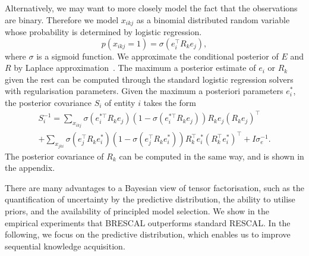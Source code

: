 Alternatively, we may want to more closely model the fact that the observations are binary.
Therefore we model $x_{ikj}$ as a binomial distributed random variable whose
probability is determined by logistic regression.
\[
p(x_{ikj}=1) = \sigma(e_i^{\top} R_k e_j),
\]
where $\sigma$ is a sigmoid function.
We approximate the conditional posterior of
$E$ and $R$ by Laplace approximation~\cite{bishop2006pattern}. The maximum a
posterior estimate of $e_i$ or $R_k$ given the rest can be computed through the
standard logistic regression solvers with regularisation parameters. Given the
maximum a posteriori parameters $e_i^*$, the posterior covariance $S_i$ of entity
$i$ takes the form
\begin{align*}
S_i^{-1} = \sum_{x_{ikj}} \sigma(e_{i}^{*\top} R_k e_{j}) (1 - \sigma(e_{i}^{*\top} R_k e_{j})) R_k
e_{j}(R_k e_{j})^\top\\
 + \sum_{x_{jki}} \sigma(e_{j}^{\top} R_k e_{i}^*) ( 1- \sigma(e_{j}^{\top} R_k e_{i}^*)) R_k^\top e^*_{i}(R_k^\top e^*_{i})^\top + I\sigma_e^{-1}
.
\end{align*}
The posterior covariance of $R_k$ can be computed in the same way, and is shown in the appendix.

There are many advantages to a Bayesian view of tensor factorisation, such as
the quantification of uncertainty by the predictive distribution,
the ability to utilise priors, and
the availability of principled model selection.
We show in the empirical experiments that BRESCAL outperforms standard RESCAL.
In the following, we focus on the predictive distribution, which enables us to
improve sequential knowledge acquisition.
